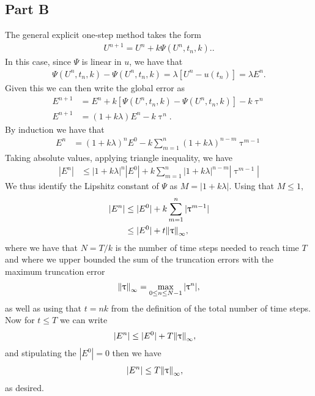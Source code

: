 \documentclass[12pt]{article}
\begin{document}
\subsection*{Part B}
The general explicit one-step method takes the form 
\begin{align}
    U^{n+1} = U^{n} + k\Psi(U^{n},t_{n},k).\label{eq:one_step_form}.
\end{align}
In this case, since $\Psi$ is linear in $u$, we have that 
\begin{align}
    \Psi(U^{n},t_{n},k) - \Psi(U^{n},t_{n},k) = \lambda \left[U^{n} - u(t_{n})\right] = \lambda E^{n}.\label{eq:linear_lipschitz}
\end{align}
Given this we can then write the global error as
\begin{subequations}
    \begin{align}
        E^{n+1} &= E^{n} + k\left[\Psi(U^{n},t_{n},k) - \Psi(U^{n},t_{n},k)\right] - k\uptau^{n}\\
        E^{n+1} &= (1+k\lambda)E^{n} - k\uptau^{n}.
    \end{align}
\end{subequations}
By induction we have that 
\begin{align}
    E^{n} &= (1+k\lambda)^{n}E^{0} - k\sum\limits_{m=1}^{n}(1+k\lambda)^{n-m}\uptau^{m-1}
\end{align}
Taking absolute values, applying triangle inequality, we have
\begin{align}
    |E^{n}| &\le |1+k\lambda|^{n}|E^{0}| + k \sum_{m=1}^{n} |1+k\lambda|^{n-m}|\uptau^{m-1}|
\end{align}
We thus identify the Lipshitz constant of $\Psi$ as $M = |1+k\lambda|$. Using that $M \le 1$,
\begin{subequations}
    \begin{align}
        |E^{n}| &\le |E^{0}| + k \sum_{m=1}^{n}|\uptau^{m-1}|\\
        &\le |E^{0}| + t\norm{\uptau}_{\infty},
    \end{align}
\end{subequations}
where we have that $N = T/k$ is the number of time steps needed to reach time $T$ and where we upper bounded the sum of the truncation errors with the maximum truncation error $$\norm{\uptau}_{\infty} = \max_{0\le n\le N-1}{|\uptau^{n}|},$$ as well as using that $t = nk$ from the definition of the total number of time steps. Now for $t \le T$ we can write
\begin{align}
    |E^{n}| &\le |E^{0}| + T\norm{\uptau}_{\infty},
\end{align}
and stipulating the $|E^{0}| = 0$ then we have 
\begin{align}
|E^{n}| &\le T\norm{\uptau}_{\infty},
\end{align}
as desired.
\end{document}

